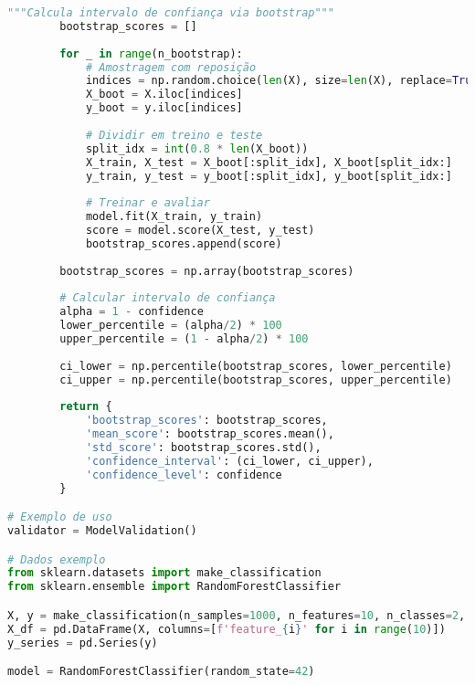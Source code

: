 \begin{pythonbox}
\begin{lstlisting}[language=Python]                                      
        """Calcula intervalo de confiança via bootstrap"""
        bootstrap_scores = []
        
        for _ in range(n_bootstrap):
            # Amostragem com reposição
            indices = np.random.choice(len(X), size=len(X), replace=True)
            X_boot = X.iloc[indices]
            y_boot = y.iloc[indices]
            
            # Dividir em treino e teste
            split_idx = int(0.8 * len(X_boot))
            X_train, X_test = X_boot[:split_idx], X_boot[split_idx:]
            y_train, y_test = y_boot[:split_idx], y_boot[split_idx:]
            
            # Treinar e avaliar
            model.fit(X_train, y_train)
            score = model.score(X_test, y_test)
            bootstrap_scores.append(score)
        
        bootstrap_scores = np.array(bootstrap_scores)
        
        # Calcular intervalo de confiança
        alpha = 1 - confidence
        lower_percentile = (alpha/2) * 100
        upper_percentile = (1 - alpha/2) * 100
        
        ci_lower = np.percentile(bootstrap_scores, lower_percentile)
        ci_upper = np.percentile(bootstrap_scores, upper_percentile)
        
        return {
            'bootstrap_scores': bootstrap_scores,
            'mean_score': bootstrap_scores.mean(),
            'std_score': bootstrap_scores.std(),
            'confidence_interval': (ci_lower, ci_upper),
            'confidence_level': confidence
        }

# Exemplo de uso
validator = ModelValidation()

# Dados exemplo
from sklearn.datasets import make_classification
from sklearn.ensemble import RandomForestClassifier

X, y = make_classification(n_samples=1000, n_features=10, n_classes=2, random_state=42)
X_df = pd.DataFrame(X, columns=[f'feature_{i}' for i in range(10)])
y_series = pd.Series(y)

model = RandomForestClassifier(random_state=42)
\end{lstlisting}
\end{pythonbox}
